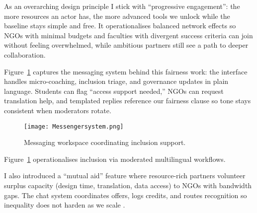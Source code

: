As an overarching design principle I stick with ``progressive engagement'': the more resources an actor has, the more advanced tools we unlock while the baseline stays simple and free. It operationalises balanced network effects so NGOs with minimal budgets and faculties with divergent success criteria can join without feeling overwhelmed, while ambitious partners still see a path to deeper collaboration.

Figure~\ref{fig:chat-system} captures the messaging system behind this fairness work: the interface handles micro-coaching, inclusion triage, and governance updates in plain language. Students can flag ``access support needed,'' NGOs can request translation help, and templated replies reference our fairness clause so tone stays consistent when moderators rotate.

\begin{figure}[H]
  \centering
  \texttt{[image: Messengersystem.png]}
  \caption{Messaging workspace coordinating inclusion support.}
  \label{fig:chat-system}
\end{figure}

Figure~\ref{fig:chat-system} operationalises inclusion via moderated multilingual workflows.

I also introduced a ``mutual aid'' feature where resource-rich partners volunteer surplus capacity (design time, translation, data access) to NGOs with bandwidth gaps. The chat system coordinates offers, logs credits, and routes recognition so inequality does not harden as we scale \citep{Lecture09}.
